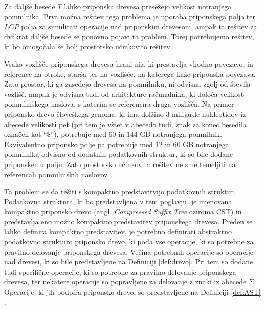 Za daljše besede $T$ lahko priponska drevesa presežejo velikost notranjega pomnilnika. Prva možna rešitev tega problema je uporaba priponskega polja ter $LCP$ polja za simulirati operacije nad priponskim drevesom, ampak ta rešitev za dvakrat daljše besede se ponovno pojavi ta problem. Torej potrebujemo rešitev, ki bo omogočala še bolj prostorsko učinkovito rešitev. 

Vsako vozlišče priponskega drevesa hrani niz, ki prestavlja vhodno povezavo, in reference na otroke, starša ter na vozlišče, na katerega kaže priponska povezava. Zato prostor, ki ga zasedejo drevesa na pomnilniku, ni odvisna zgolj od števila vozlišč, ampak je odvisna tudi od arhitekture računalnika, ki določa velikost pomnilniškega naslova, s katerim se referencira druga vozlišča. Na primer priponsko drevo človeškega genoma, ki ima dolžino 3 milijarde nukleotidov iz abecede velikosti pet (pri tem je vštet v abecedo tudi, znak za konec besedila označen kot \enquote{\$}), potrebuje med $60$ in $144$ GB notranjega pomnilnik. Ekvivalentno priponsko polje pa potrebuje med $12$ in $60$ GB notranjega pomnilnika odvisno od dodatnih podatkovnih struktur, ki so bile dodane priponskemu polju. Zato prostorsko učinkovita rešitev ne sme temeljiti na referencah pomnilniških naslovov \cite{GENOMEKNOWLEDGEHUB-2024-10-30}.

Ta problem se da rešiti s kompaktno predstavitvijo podatkovnih struktur. Podatkovna struktura, ki bo predstavljena v tem poglavju, je imenovana kompaktno priponsko drevo (angl. \textit{Compressed Suffix Tree} oziroma CST) in predstavlja eno možno kompaktno predstavitev priponskega drevesa. Preden se lahko definira kompaktno predstavitev, je potrebno definirati abstraktno podatkovno strukturo priponsko drevo, ki poda vse operacije, ki so potrebne za pravilno delovanje priponskega drevesa. Večina potrebnih operacije so operacije nad drevesi, ki so bile predstavljene na Definiciji \ref{def:drevo}. Pri tem so dodane tudi specifične operacije, ki so potrebne za pravilno delovanje priponskega drevesa, ter nekatere operacije so popravljene za delovanje z znaki iz abecede $\Sigma$. Operacije, ki jih podpira priponsko drevo, so predstavljene na Definiciji \ref{def:AST} \cite{Sadakane2007}.

